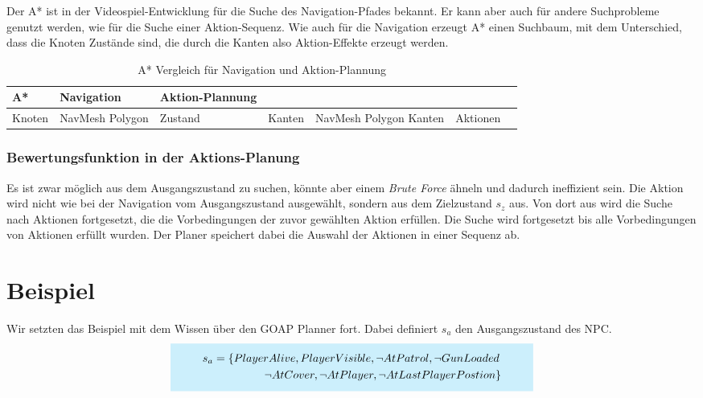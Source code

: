 Der A* ist in der Videospiel-Entwicklung für die Suche des Navigation-Pfades bekannt. Er kann aber auch für andere Suchprobleme genutzt werden, wie für die Suche einer Aktion-Sequenz. Wie auch für die Navigation erzeugt A* einen Suchbaum, mit dem Unterschied, dass die Knoten Zustände sind, die durch die Kanten also Aktion-Effekte erzeugt werden.

\begin{table}[h]
  \caption{A* Vergleich für Navigation und Aktion-Plannung}
  \label{A*: Vergleich}
  \renewcommand{\arraystretch}{1.2}
  \centering
  \small
    \begin{tabularx}{0.95\textwidth}{X X X}
      \toprule
      \textbf{A*} & \textbf{Navigation} & \textbf{Aktion-Plannung}\\
      \toprule
      Knoten & NavMesh Polygon & Zustand &
			Kanten & NavMesh Polygon Kanten & Aktionen &
      \bottomrule
    \end{tabularx}
\end{table}


\subsubsection{Bewertungsfunktion in der Aktions-Planung}

Es ist zwar möglich aus dem Ausgangszustand zu suchen, könnte aber einem \textit{Brute Force} ähneln und dadurch ineffizient sein. Die Aktion wird nicht wie bei der Navigation vom Ausgangszustand ausgewählt, sondern aus dem Zielzustand $s_z$ aus. Von dort aus wird die Suche nach Aktionen fortgesetzt, die die Vorbedingungen der zuvor gewählten Aktion erfüllen. Die Suche wird fortgesetzt bis alle Vorbedingungen von Aktionen erfüllt wurden. Der Planer speichert dabei die Auswahl der Aktionen in einer Sequenz ab.




\section{Beispiel}

Wir setzten das Beispiel mit dem Wissen über den GOAP Planner fort. Dabei definiert $s_a$ den Ausgangszustand des NPC.
\[
	\highlightbox{0.9\textwidth}{$
		\begin{align*}
			s_a = \{PlayerAlive, PlayerVisible, \lnot AtPatrol, \lnot GunLoaded\, \\
			\lnot AtCover, \lnot AtPlayer,  \lnot AtLastPlayerPostion\}
		\end{align*}
	$}
\]


